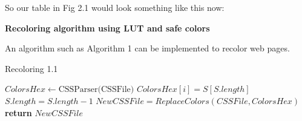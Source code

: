 So our table in Fig 2.1 would look something like this now:

{\vspace{10mm}}
\label{Tick}

\textbf{Recoloring algorithm using LUT and safe colors}


An algorithm such as Algorithm 1 can be implemented to recolor web pages.

\makeatletter
\def\BState{\State\hskip-\ALG@thistlm}
\makeatother

\begin{algorithm}[!htb]
\caption{Recoloring 1.1}\label{euclid}
\begin{algorithmic}[1]
\State ${ColorsHex} \gets \text{CSSParser(CSSFile)}$ 
        		\State $ColorsHex[i] = S[S.length]$
        		\State $S.length = S.length - 1$
        	\EndIf
        \EndFor
      \EndFor
\State $NewCSSFile = ReplaceColors(CSSFile, ColorsHex)$
\State \textbf{return} $NewCSSFile$
\EndProcedure
\end{algorithmic}
\end{algorithm}

